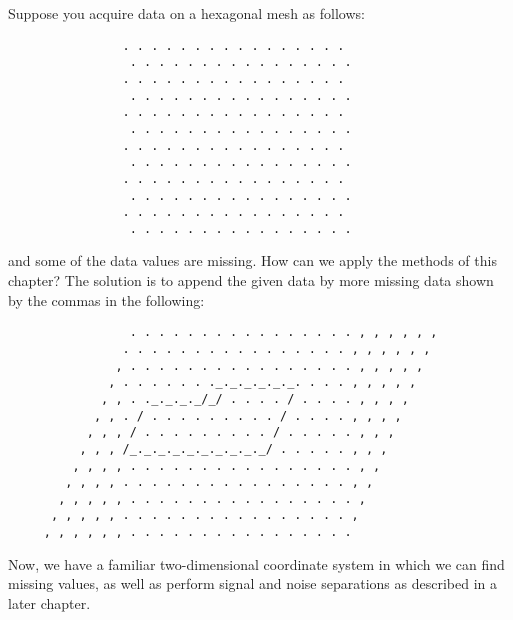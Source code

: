 \par
Suppose you acquire data on a hexagonal mesh as follows:
\par\noindent
\begin{verbatim}
                . . . . . . . . . . . . . . . .
                 . . . . . . . . . . . . . . . .
                . . . . . . . . . . . . . . . .
                 . . . . . . . . . . . . . . . .
                . . . . . . . . . . . . . . . .
                 . . . . . . . . . . . . . . . .
                . . . . . . . . . . . . . . . .
                 . . . . . . . . . . . . . . . .
                . . . . . . . . . . . . . . . .
                 . . . . . . . . . . . . . . . .
                . . . . . . . . . . . . . . . .
                 . . . . . . . . . . . . . . . .
\end{verbatim}
\par\noindent
and some of the data values are missing.
How can we apply the methods of this chapter?
The solution is to append the given data by more missing data
shown by the commas in the following:
\par\noindent
\begin{verbatim}
                 . . . . . . . . . . . . . . . . , , , , , ,
                . . . . . . . . . . . . . . . . , , , , , ,
               , . . . . . . . . . . . . . . . . , , , , ,
              , . . . . . . ._._._._._._. . . . , , , , ,
             , , . ._._._._/_/ . . . . / . . . . , , , ,
            , , . / . . . . . . . . . / . . . . , , , ,
           , , , / . . . . . . . . . / . . . . . , , ,
          , , , /_._._._._._._._._._/ . . . . . , , ,
         , , , , . . . . . . . . . . . . . . . . , ,
        , , , , . . . . . . . . . . . . . . . . , ,
       , , , , , . . . . . . . . . . . . . . . . ,
      , , , , , . . . . . . . . . . . . . . . . ,
     , , , , , , . . . . . . . . . . . . . . . . 
\end{verbatim}
\par\noindent
Now, we have a familiar two-dimensional coordinate system
in which we can find missing values,
as well as perform signal and noise separations
as described in a later chapter.




